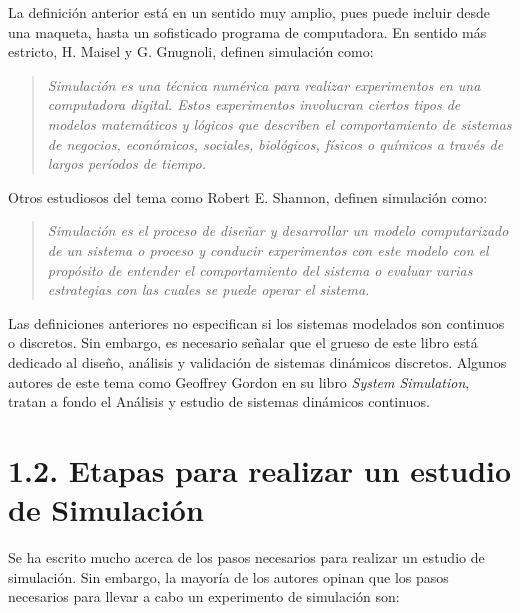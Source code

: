 \documentclass[11pt,letterpaper]{report}
\begin{document}
La definición anterior está en un sentido muy amplio, pues puede incluir
desde una maqueta, hasta un sofisticado programa de computadora. En
sentido más estricto, H. Maisel y G. Gnugnoli, definen simulación como:

\begin{quote}
\emph{Simulación es una técnica numérica para realizar experimentos en
una computadora digital. Estos experimentos involucran ciertos tipos de
modelos matemáticos y lógicos que describen el comportamiento de
sistemas de negocios, económicos, sociales, biológicos, físicos o
químicos a través de largos períodos de tiempo.}
\end{quote}

Otros estudiosos del tema como Robert E. Shannon, definen simulación
como:

\begin{quote}
\emph{Simulación es el proceso de diseñar y desarrollar un modelo
computarizado de un sistema o proceso y conducir experimentos con este
modelo con el propósito de entender el comportamiento del sistema o
evaluar varias estrategias con las cuales se puede operar el sistema.}
\end{quote}

Las definiciones anteriores no especifican si los sistemas modelados son
continuos o discretos. Sin embargo, es necesario señalar que el grueso
de este libro está dedicado al diseño, análisis y validación de sistemas
dinámicos discretos. Algunos autores de este tema como Geoffrey Gordon
en su libro \emph{System Simulation}, tratan a fondo el Análisis y
estudio de sistemas dinámicos continuos.

\section*{1.2. Etapas para realizar un estudio de Simulación}

Se ha escrito mucho acerca de los pasos necesarios para realizar un
estudio de simulación. Sin embargo, la mayoría de los autores opinan que
los pasos necesarios para llevar a cabo un experimento de simulación
son:
\end{document}
